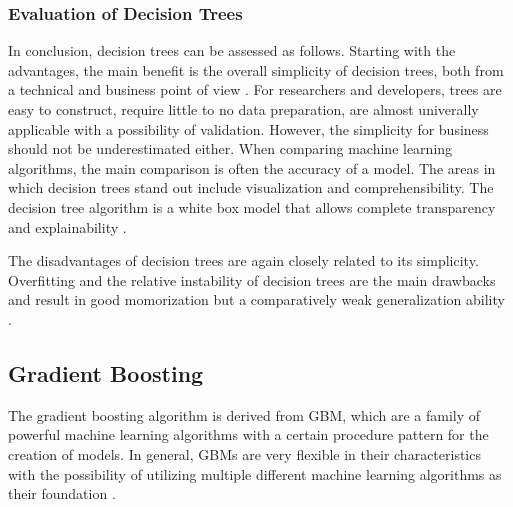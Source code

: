 %

\subsubsection{Evaluation of Decision Trees}

In conclusion, decision trees can be assessed as follows. Starting with the advantages,
the main benefit is the overall simplicity of decision trees, both from a technical and 
business point of view \cite[p.339]{James2021}. For researchers and developers, trees are easy to construct, require little
to no data preparation, are almost univerally applicable with a possibility of validation. 
However, the simplicity for business should not be underestimated either. When comparing machine
learning algorithms, the main comparison is often the accuracy of a model. The areas in which 
decision trees stand out include visualization and comprehensibility. The decision tree algorithm 
is a white box model that allows complete transparency and explainability \cite[10.10.]{sklearn Decision Trees}. 

The disadvantages of decision trees are again closely related to its simplicity. Overfitting and 
the relative instability of decision trees are the main drawbacks and result in good momorization 
but a comparatively weak generalization ability \cite[p.340]{James2021} \cite[10.10.]{sklearn Decision Trees}.

\subsection{Gradient Boosting}
\label{sec:Gradient Boosting}


The gradient boosting algorithm is derived from \ac{GBM}, which are a family of 
powerful machine learning algorithms with a certain procedure pattern for the creation of models. 
In general, \ac{GBM}s are very flexible in their characteristics with the possibility of utilizing 
multiple different machine learning algorithms as their foundation \cite{Natekin2013}.

